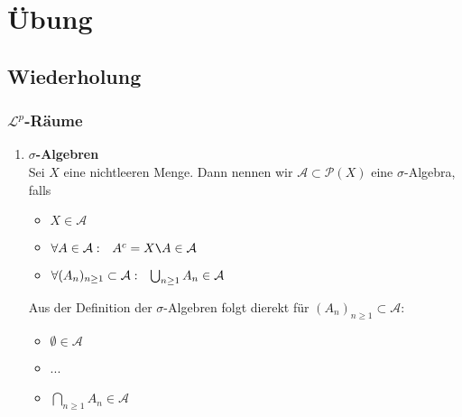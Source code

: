 
\chapter{Übung}

\section{Wiederholung}

\subsection{$\mathcal{L}^{p}$-Räume}
\begin{enumerate}
	\item \textbf{$\sigma$-Algebren} \\
	Sei $X$ eine nichtleeren Menge. Dann nennen wir $\mathcal{A} \subset \mathcal{P}(X)$ eine $\sigma$-Algebra, falls
		\begin{itemize}
			\item $X \in \mathcal{A}$
			\item $\forall A \in \mathcal{A}: \hspace{0.25cm} A^{c} = X\verb|\|A \in \mathcal{A}$
			\item $\forall (A_{n})_{n \geq 1} \subset \mathcal{A}: \hspace{0.25cm} \bigcup_{n \geq 1} A_{n} \in \mathcal{A}$
		\end{itemize}
	\begin{bemerkung}
		Aus der Definition der $\sigma$-Algebren folgt dierekt für $(A_{n})_{n \geq 1} \subset \mathcal{A}$:
		\begin{itemize}
			\item $\emptyset \in \mathcal{A}$
			\item ...
			\item $\bigcap_{n \geq 1} A_{n} \in \mathcal{A}$
		\end{itemize}
	\end{bemerkung}

\end{enumerate}